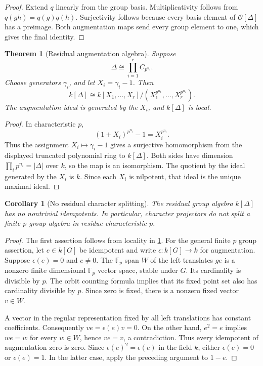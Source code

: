 \documentclass[11pt]{amsart}
\newtheorem{theorem}{Theorem}[section]
\newtheorem{corollary}[corollary]{Corollary}
\theoremstyle{definition}
\theoremstyle{remark}
\newcommand{\OO}{\mathcal O}
\newcommand{\FF}{\mathbb F}
\newcommand{\abs}[1]{\left\lvert#1\right\rvert}
\begin{document}
\begin{proof}
Extend \(q\) linearly from the group basis. Multiplicativity follows from \(q(gh)=q(g)q(h)\). Surjectivity follows because every basis element of \(\OO[\Delta]\) has a preimage. Both augmentation maps send every group element to one, which gives the final identity.
\end{proof}

\begin{theorem}[Residual augmentation algebra]\label{thm:residual_augmentation_algebra}
Suppose
\[
\Delta\cong
\prod_{i=1}^{r}C_{p^{n_i}}.
\]
Choose generators \(\gamma_i\), and let \(X_i=\gamma_i-1\). Then
\[
\boxed{
k[\Delta]
\cong
k[X_1,\ldots,X_r]
\big/
(X_1^{p^{n_1}},\ldots,X_r^{p^{n_r}}).
}
\]
The augmentation ideal is generated by the \(X_i\), and \(k[\Delta]\) is local.
\end{theorem}

\begin{proof}
In characteristic \(p\),
\[
(1+X_i)^{p^{n_i}}-1=X_i^{p^{n_i}}.
\]
Thus the assignment \(X_i\mapsto\gamma_i-1\) gives a surjective homomorphism from the displayed truncated polynomial ring to \(k[\Delta]\). Both sides have dimension \(\prod_ip^{n_i}=\abs{\Delta}\) over \(k\), so the map is an isomorphism. The quotient by the ideal generated by the \(X_i\) is \(k\). Since each \(X_i\) is nilpotent, that ideal is the unique maximal ideal.
\end{proof}

\begin{corollary}[No residual character splitting]\label{cor:no_residual_character_splitting}
The residual group algebra \(k[\Delta]\) has no nontrivial idempotents. In particular, character projectors do not split a finite \(p\) group algebra in residue characteristic \(p\).
\end{corollary}

\begin{proof}
The first assertion follows from locality in \cref{thm:residual_augmentation_algebra}. For the general finite \(p\) group assertion, let \(e\in k[G]\) be idempotent and write \(\epsilon:k[G]\to k\) for augmentation. Suppose \(\epsilon(e)=0\) and \(e\ne0\). The \(\FF_p\) span \(W\) of the left translates \(ge\) is a nonzero finite dimensional \(\FF_p\) vector space, stable under \(G\). Its cardinality is divisible by \(p\). The orbit counting formula implies that its fixed point set also has cardinality divisible by \(p\). Since zero is fixed, there is a nonzero fixed vector \(v\in W\).

A vector in the regular representation fixed by all left translations has constant coefficients. Consequently \(ve=\epsilon(e)v=0\). On the other hand, \(e^2=e\) implies \(we=w\) for every \(w\in W\), hence \(ve=v\), a contradiction. Thus every idempotent of augmentation zero is zero. Since \(\epsilon(e)^2=\epsilon(e)\) in the field \(k\), either \(\epsilon(e)=0\) or \(\epsilon(e)=1\). In the latter case, apply the preceding argument to \(1-e\).
\end{proof}
\end{document}
